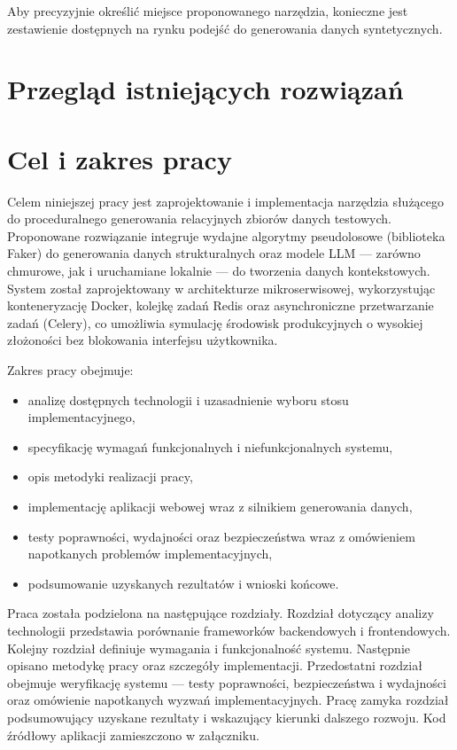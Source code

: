 Aby precyzyjnie określić miejsce proponowanego narzędzia, konieczne jest zestawienie dostępnych na rynku podejść do generowania danych syntetycznych.

\section*{Przegląd istniejących rozwiązań}


\section*{Cel i zakres pracy}

Celem niniejszej pracy jest zaprojektowanie i implementacja narzędzia służącego do proceduralnego generowania relacyjnych zbiorów danych testowych. Proponowane rozwiązanie integruje wydajne algorytmy pseudolosowe (biblioteka Faker) do generowania danych strukturalnych oraz modele \gls{LLM} --- zarówno chmurowe, jak i uruchamiane lokalnie --- do tworzenia danych kontekstowych. System został zaprojektowany w architekturze mikroserwisowej, wykorzystując konteneryzację Docker, kolejkę zadań Redis oraz asynchroniczne przetwarzanie zadań (Celery), co umożliwia symulację środowisk produkcyjnych o wysokiej złożoności bez blokowania interfejsu użytkownika.

Zakres pracy obejmuje:
\begin{itemize}
    \item analizę dostępnych technologii i uzasadnienie wyboru stosu implementacyjnego,
    \item specyfikację wymagań funkcjonalnych i niefunkcjonalnych systemu,
    \item opis metodyki realizacji pracy,
    \item implementację aplikacji webowej wraz z silnikiem generowania danych,
    \item testy poprawności, wydajności oraz bezpieczeństwa wraz z omówieniem napotkanych problemów implementacyjnych,
    \item podsumowanie uzyskanych rezultatów i wnioski końcowe.
\end{itemize}

Praca została podzielona na następujące rozdziały. Rozdział dotyczący analizy technologii przedstawia porównanie frameworków backendowych i frontendowych. Kolejny rozdział definiuje wymagania i funkcjonalność systemu. Następnie opisano metodykę pracy oraz szczegóły implementacji. Przedostatni rozdział obejmuje weryfikację systemu --- testy poprawności, bezpieczeństwa i wydajności oraz omówienie napotkanych wyzwań implementacyjnych. Pracę zamyka rozdział podsumowujący uzyskane rezultaty i wskazujący kierunki dalszego rozwoju. Kod źródłowy aplikacji zamieszczono w załączniku.
